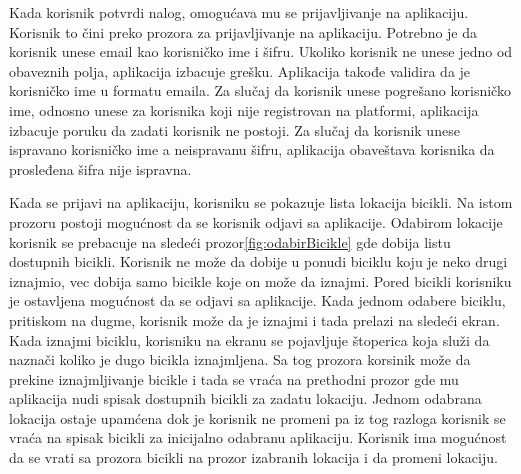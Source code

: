 \documentclass[12pt,oneside]{memoir}
\begin{document}
Kada korisnik potvrdi nalog, omogućava mu se prijavljivanje na aplikaciju. Korisnik to čini preko prozora za prijavljivanje na aplikaciju. Potrebno je da korisnik unese email kao korisničko ime i šifru. Ukoliko korisnik ne unese jedno od obaveznih polja, aplikacija izbacuje grešku. Aplikacija takođe validira da je korisničko ime u formatu emaila. Za slučaj da korisnik unese pogrešano korisničko ime, odnosno unese za korisnika koji nije registrovan na platformi, aplikacija izbacuje poruku da zadati korisnik ne postoji. Za slučaj da korisnik unese ispravano korisničko ime a neispravanu šifru, aplikacija obaveštava korisnika da prosleđena šifra nije ispravna.
 
Kada se prijavi na aplikaciju, korisniku se pokazuje lista lokacija bicikli. Na istom prozoru postoji mogućnost da se korisnik odjavi sa aplikacije. Odabirom lokacije korisnik se prebacuje na sledeći prozor\ref{fig:odabirBicikle} gde dobija listu dostupnih bicikli. Korisnik ne može da dobije u ponudi biciklu koju je neko drugi iznajmio, vec dobija samo bicikle koje on može da iznajmi. Pored bicikli korisniku je ostavljena mogućnost da se odjavi sa aplikacije. Kada jednom odabere biciklu, pritiskom na dugme, korisnik može da je iznajmi i tada prelazi na sledeći ekran. Kada iznajmi biciklu, korisniku na ekranu se pojavljuje štoperica koja služi da naznači koliko je dugo bicikla iznajmljena. Sa tog prozora korsinik može da prekine iznajmljivanje bicikle i tada se vraća na prethodni prozor gde mu aplikacija nudi spisak dostupnih bicikli za zadatu lokaciju. Jednom odabrana lokacija ostaje upamćena dok je korisnik ne promeni pa iz tog razloga korisnik se vraća na spisak bicikli za inicijalno odabranu aplikaciju. Korisnik ima mogućnost da se vrati sa prozora bicikli na prozor izabranih lokacija i da promeni lokaciju.
 
\end{document}
